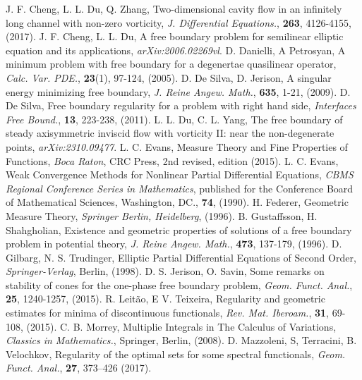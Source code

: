 \documentclass[11pt,reqno]{amsart}
\begin{document}
\begin{thebibliography}{60}
	 J. F. Cheng, L. L. Du, Q. Zhang, \newblock Two-dimensional cavity flow in an infinitely long channel with non-zero vorticity, {\it J. Differential Equations.}, {\bf 263}, 4126-4155, (2017).
	 J. F. Cheng, L. L. Du, \newblock A free boundary problem for semilinear elliptic equation and its applications, \emph{arXiv:2006.02269vl}.
	 D. Danielli, A Petrosyan, \newblock A minimum problem with free boundary for a degenertae quasilinear operator, {\it Calc. Var. PDE.}, {\bf 23}(1), 97-124, (2005).
	 D. De Silva, D. Jerison, \newblock A singular energy minimizing free boundary, {\it J. Reine Angew. Math.}, {\bf 635}, 1-21, (2009).
	 D. De Silva,  \newblock Free boundary regularity for a problem with right hand side, {\it Interfaces Free Bound.}, {\bf 13}, 223-238, (2011).
	 L. L. Du, C. L. Yang, \newblock The free boundary of steady axisymmetric inviscid flow with vorticity II: near the non-degenerate points, {\it 	arXiv:2310.09477}.
	 L. C. Evans, \newblock Measure Theory and Fine Properties of Functions, {\it Boca Raton}, CRC Press, 2nd revised,  edition (2015).
	 L. C. Evans, \newblock Weak Convergence Methods for Nonlinear Partial Differential Equations, {\it CBMS Regional Conference Series in Mathematics}, published for the Conference Board of Mathematical Sciences, Washington, DC., {\bf 74}, (1990).
	 H. Federer, \newblock Geometric Measure Theory, {\it Springer Berlin, Heidelberg}, (1996).
	 B. Gustaffsson, H. Shahgholian, Existence and geometric properties of solutions of a free boundary problem in potential theory, {\it J. Reine Angew. Math.}, {\bf 473}, 137-179, (1996).
	 D. Gilbarg, N. S. Trudinger, \newblock Elliptic Partial Differential Equations of Second Order, {\it Springer-Verlag}, Berlin, (1998).
	 D. S. Jerison, O. Savin, \newblock Some remarks on stability of cones for the one-phase free boundary problem, {\it Geom. Funct. Anal.}, {\bf 25}, 1240-1257, (2015).
	 R. Leit\~{a}o, E V. Teixeira, Regularity and geometric estimates for minima of discontinuous functionals, {\it Rev. Mat. Iberoam.}, {\bf 31}, 69-108, (2015).
	 C. B. Morrey, \newblock Multiplie Integrals in The Calculus of Variations, {\it  Classics in Mathematics.}, Springer, Berlin, (2008).
	 D. Mazzoleni, S, Terracini, B. Velochkov, \newblock Regularity of the optimal sets for some spectral functionals, {\it Geom. Funct. Anal.}, {\bf 27}, 373–426 (2017). 

\end{thebibliography}
\end{document}
